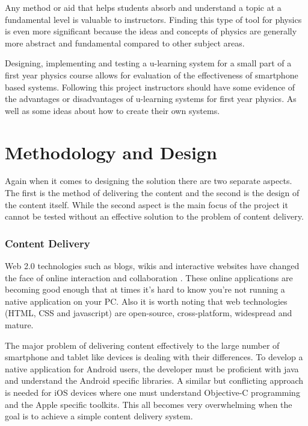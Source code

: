 \documentclass[12pt,a4paper]{article}  %
\begin{document}
Any method or aid that helps students absorb and understand a topic at
a fundamental level is valuable to instructors. Finding this type of
tool for physics is even more significant because the ideas and
concepts of physics are generally more abstract and fundamental
compared to other subject areas. 

Designing, implementing and testing a u-learning system for a small
part of a first year physics course allows for evaluation of the
effectiveness of smartphone based systems. Following this project
instructors should have some evidence of the advantages or
disadvantages of u-learning systems for first year physics. As well as
some ideas about how to create their own systems.

\section*{Methodology and Design}

Again when it comes to designing the solution there are two separate
aspects. The first is the method of delivering the content and the
second is the design of the content itself. While the second aspect is
the main focus of the project it cannot be tested without an effective
solution to the problem of content delivery.


\subsubsection*{Content Delivery}

Web 2.0 technologies such as blogs, wikis and interactive websites
have changed the face of online interaction and collaboration
\cite{procsmart}. These online applications are becoming good enough
that at times it's hard to know you're not running a native application
on your PC. Also it is worth noting that web technologies (HTML, CSS
and javascript) are open-source, cross-platform, widespread and mature. 

The major problem of delivering content effectively to the large
number of smartphone and tablet like devices is dealing with their
differences.  To develop a native application for Android users, the
developer must be proficient with java and understand the Android
specific libraries. A similar but conflicting approach is needed for
iOS devices where one must understand Objective-C programming and the
Apple specific toolkits. This all becomes very overwhelming when the
goal is to achieve a simple content delivery system. 
\end{document}
